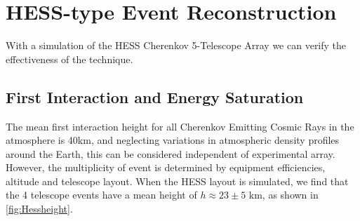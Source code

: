 \documentclass{article}
\begin{document}
\section{HESS-type Event Reconstruction}
With a simulation of the HESS Cherenkov 5-Telescope Array we can verify the effectiveness of the technique. 
\subsection{First Interaction and Energy Saturation}
The mean first interaction height for all Cherenkov Emitting Cosmic Rays in the atmosphere is 40km, and neglecting variations in atmospheric density profiles around the Earth, this can be considered independent of experimental array. However, the multiplicity of event is determined by equipment efficiencies, altitude and telescope layout. When the HESS layout is simulated, we find that the 4 telescope events have a mean height of $h \approx 23 \pm 5$ km, as shown in \ref{fig:Hessheight}.
\end{document}
